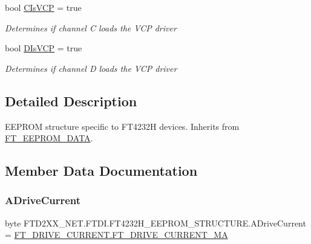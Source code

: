 \begin{DoxyCompactItemize}
bool \mbox{\hyperlink{class_f_t_d2_x_x___n_e_t_1_1_f_t_d_i_1_1_f_t4232_h___e_e_p_r_o_m___s_t_r_u_c_t_u_r_e_a0a4208c6ff6a6fa35250d694c8869984}{C\+Is\+V\+CP}} = true
\begin{DoxyCompactList}\small\item\em Determines if channel C loads the V\+CP driver \end{DoxyCompactList}\item 
bool \mbox{\hyperlink{class_f_t_d2_x_x___n_e_t_1_1_f_t_d_i_1_1_f_t4232_h___e_e_p_r_o_m___s_t_r_u_c_t_u_r_e_aede1c4602ce6661ab0d2d2c9abe187d2}{D\+Is\+V\+CP}} = true
\begin{DoxyCompactList}\small\item\em Determines if channel D loads the V\+CP driver \end{DoxyCompactList}\end{DoxyCompactItemize}


\subsection{Detailed Description}
E\+E\+P\+R\+OM structure specific to F\+T4232H devices. Inherits from \mbox{\hyperlink{class_f_t_d2_x_x___n_e_t_1_1_f_t_d_i_1_1_f_t___e_e_p_r_o_m___d_a_t_a}{F\+T\+\_\+\+E\+E\+P\+R\+O\+M\+\_\+\+D\+A\+TA}}. 



\subsection{Member Data Documentation}
\mbox{\label{class_f_t_d2_x_x___n_e_t_1_1_f_t_d_i_1_1_f_t4232_h___e_e_p_r_o_m___s_t_r_u_c_t_u_r_e_aa46794d26e6116a8d72e7ca8431612e9}} 
\subsubsection{\texorpdfstring{ADriveCurrent}{ADriveCurrent}}
{\footnotesize\ttfamily byte F\+T\+D2\+X\+X\+\_\+\+N\+E\+T.\+F\+T\+D\+I.\+F\+T4232\+H\+\_\+\+E\+E\+P\+R\+O\+M\+\_\+\+S\+T\+R\+U\+C\+T\+U\+R\+E.\+A\+Drive\+Current = \mbox{\hyperlink{class_f_t_d2_x_x___n_e_t_1_1_f_t_d_i_1_1_f_t___d_r_i_v_e___c_u_r_r_e_n_t_af6b404bcc6f2eb88bbc95b183d5729ea}{F\+T\+\_\+\+D\+R\+I\+V\+E\+\_\+\+C\+U\+R\+R\+E\+N\+T.\+F\+T\+\_\+\+D\+R\+I\+V\+E\+\_\+\+C\+U\+R\+R\+E\+N\+T\+\_\+MA}}}



